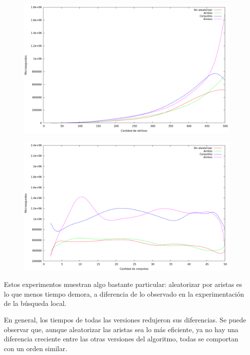 \begin{figure}[H]
  \begin{center}
    \includegraphics[scale=0.35]{imagenes/grasp-local-n-tiempo.png}
  \end{center}
\end{figure}

\begin{figure}[H]
  \begin{center}
    \includegraphics[scale=0.35]{imagenes/grasp-local-k-tiempo.png}
  \end{center}
\end{figure}

Estos experimentos muestran algo bastante particular: aleatorizar por aristas
es lo que menos tiempo demora, a diferencia de lo observado en la
experimentación de la búsqueda local.

En general, los tiempos de todas las versiones redujeron sus diferencias. Se
puede observar que, aunque aleatorizar las aristas sea lo más eficiente, ya no
hay una diferencia creciente entre las otras versiones del algoritmo, todas
se comportan con un orden similar.

